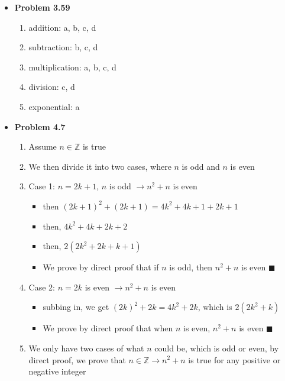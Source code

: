 \documentclass{article}
\begin{document}
    \begin{itemize}
        \item \textbf{Problem 3.59}
        \begin{enumerate}
            \item addition: a, b, c, d
            \item subtraction: b, c, d
            \item multiplication: a, b, c, d
            \item division: c, d
            \item exponential: a
        \end{enumerate}

        \item \textbf{Problem 4.7}
        \begin{enumerate}
            \item Assume $n \in \mathbb{Z}$ is true
            \item We then divide it into two cases, where $n$ is odd and $n$ is even
            \item Case 1: $n = 2k + 1$, $n$ is odd $\rightarrow n^2 + n$ is even
            \begin{itemize}
                \item then $(2k+1)^2 + (2k+1) = 4k^2 + 4k + 1+ 2k + 1$
                \item then, $4k^2 + 4k + 2k + 2$
                \item then, $2(2k^2 + 2k + k + 1)$
                \item We prove by direct proof that if $n$ is odd, then $n^2+n$ is even $\blacksquare$
            \end{itemize}
            \item Case 2: $n = 2k$ is even $\rightarrow n^2 + n$ is even
            \begin{itemize}
                \item subbing in, we get $(2k)^2 + 2k = 4k^2 + 2k$, which is $2(2k^2 + k)$
                \item We prove by direct proof that when $n$ is even, $n^2 + n$ is even $\blacksquare$
            \end{itemize}
            \item We only have two cases of what $n$ could be, which is odd or even, by direct proof, we prove that $n \in \mathbb{Z} \rightarrow n^2 + n$ is true for any positive or negative integer
        \end{enumerate}
        

\end{itemize}
\end{document}
